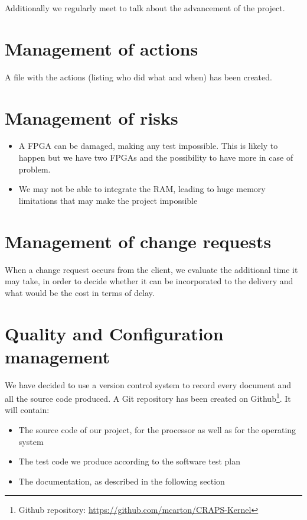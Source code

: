 \documentclass{article}
\begin{document}
    Additionally we regularly meet to talk about the advancement of the project.

  \section{Management of actions}
    A file with the actions (listing who did what and when) has been created.

  \section{Management of risks}
    \begin{itemize}
      \item A FPGA can be damaged, making any test impossible. This is likely to
          happen but we have two FPGAs and the possibility to have more in case
          of problem.
      \item We may not be able to integrate the RAM, leading to huge memory
          limitations that may make the project impossible
    \end{itemize}

  \section{Management of change requests}
    When a change request occurs from the client, we evaluate the additional
    time it may take, in order to decide whether it can be incorporated to the
    delivery and what would be the cost in terms of delay.

  \section{Quality and Configuration management}
    We have decided to use a version control system to record every document and
    all the source code produced. A Git repository has been created on
    Github\footnote{Github repository:
    \url{https://github.com/mcarton/CRAPS-Kernel}}.
    It will contain:
    \begin{itemize}
      \item The source code of our project, for the processor as well as for the
            operating system
      \item The test code we produce according to the software test plan
      \item The documentation, as described in the following section
    \end{itemize}
\end{document}
